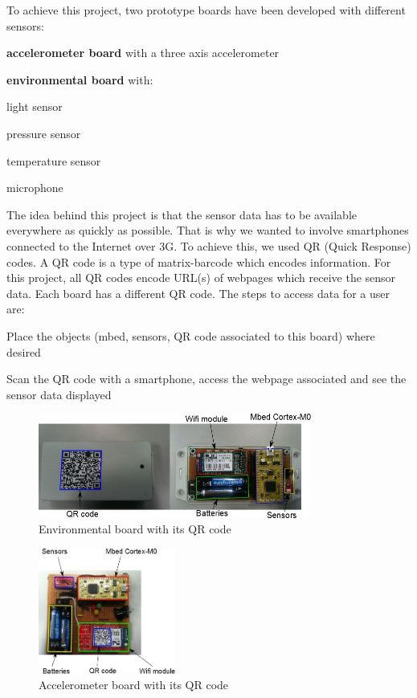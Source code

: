 \documentclass[pdftex,10pt,a4paper]{report}
\newenvironment{packed_item}{
\begin{itemize}
  \setlength{\itemsep}{1pt}
  \setlength{\parskip}{0pt}
  \setlength{\parsep}{0pt}
}{\end{itemize}}
\begin{document}
To achieve this project, two prototype boards have been developed with different sensors:

\begin{packed_item}
	\item \textbf{accelerometer board} with a three axis accelerometer
	\item \textbf{environmental board} with:
		\begin{packed_item}
			\item light sensor
			\item pressure sensor
			\item temperature sensor
			\item microphone
		\end{packed_item}
\end {packed_item}

The idea behind this project is that the sensor data has to be available everywhere as quickly as possible. That is why we wanted to involve smartphones connected to the Internet over 3G. To achieve this, we used QR (Quick Response) codes. A QR code is a type of matrix-barcode which encodes information. For this project, all QR codes encode URL(s) of webpages which receive the sensor data. Each board has a different QR code. The steps to access data for a user are:

\begin{packed_item}
	\item Place the objects (mbed, sensors, QR code associated to this board) where desired
	\item Scan the QR code with a smartphone, access the webpage associated and see the sensor data displayed
\end{packed_item}

\begin{figure}[h!]
		\centering
		\includegraphics[width=0.8\textwidth]{./env_board_qr.jpg}
		\caption{Environmental board with its QR code}
		\label{Environmental board with its QR code}
\end{figure}

\begin{figure}[h!]
		\centering
		\includegraphics[width=0.4\textwidth]{./acc_board_component.jpg}
		\caption{Accelerometer board with its QR code}
		\label{Accelerometer board with its QR code}
\end{figure}
\end{document}
